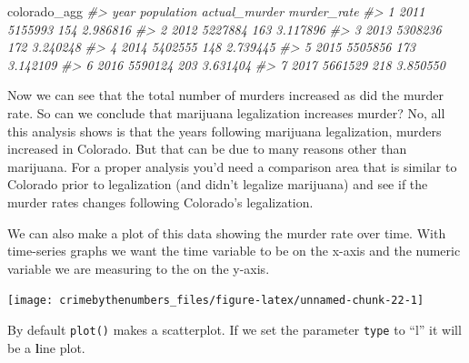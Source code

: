 \documentclass[
  12pt,
]{book}
\newenvironment{Shaded}{\begin{snugshade}}{\end{snugshade}}
\newcommand{\AttributeTok}[1]{\textcolor[rgb]{0.61,0.61,0.61}{#1}}
\newcommand{\CommentTok}[1]{\textcolor[rgb]{0.37,0.37,0.37}{\textit{#1}}}
\newcommand{\FunctionTok}[1]{\textcolor[rgb]{0,0,0}{#1}}
\newcommand{\NormalTok}[1]{#1}
\newcommand{\SpecialCharTok}[1]{\textcolor[rgb]{0,0,0}{#1}}
\newcommand{\StringTok}[1]{\textcolor[rgb]{0.5,0.5,0.5}{#1}}
\begin{document}
\begin{Shaded}
\begin{Highlighting}[]
\NormalTok{colorado\_agg}
\CommentTok{\#\textgreater{}   year population actual\_murder murder\_rate}
\CommentTok{\#\textgreater{} 1 2011    5155993           154    2.986816}
\CommentTok{\#\textgreater{} 2 2012    5227884           163    3.117896}
\CommentTok{\#\textgreater{} 3 2013    5308236           172    3.240248}
\CommentTok{\#\textgreater{} 4 2014    5402555           148    2.739445}
\CommentTok{\#\textgreater{} 5 2015    5505856           173    3.142109}
\CommentTok{\#\textgreater{} 6 2016    5590124           203    3.631404}
\CommentTok{\#\textgreater{} 7 2017    5661529           218    3.850550}
\end{Highlighting}
\end{Shaded}

Now we can see that the total number of murders increased as did the murder rate. So can we conclude that marijuana legalization increases murder? No, all this analysis shows is that the years following marijuana legalization, murders increased in Colorado. But that can be due to many reasons other than marijuana. For a proper analysis you'd need a comparison area that is similar to Colorado prior to legalization (and didn't legalize marijuana) and see if the murder rates changes following Colorado's legalization.

We can also make a plot of this data showing the murder rate over time. With time-series graphs we want the time variable to be on the x-axis and the numeric variable we are measuring to the on the y-axis.

\begin{Shaded}
\end{Shaded}

\begin{center}\texttt{[image: crimebythenumbers\_files/figure-latex/unnamed-chunk-22-1]} \end{center}

By default \texttt{plot()} makes a scatterplot. If we set the parameter \texttt{type} to ``l'' it will be a \textbf{l}ine plot.

\begin{Shaded}
\end{Shaded}
\end{document}
